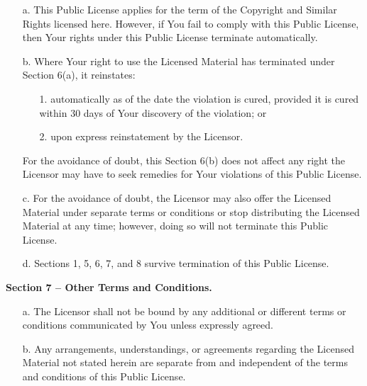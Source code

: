 \begin{enumerate}

	\item[a.] This Public License applies for the term of the Copyright and
	Similar Rights licensed here. However, if You fail to comply with
	this Public License, then Your rights under this Public License
	terminate automatically.

	\item[b.] Where Your right to use the Licensed Material has terminated under
	Section 6(a), it reinstates:

	\begin{enumerate}

		\item[1.] automatically as of the date the violation is cured, provided
			it is cured within 30 days of Your discovery of the
			violation; or

		\item[2.] upon express reinstatement by the Licensor.

	\end{enumerate}

	For the avoidance of doubt, this Section 6(b) does not affect any
	right the Licensor may have to seek remedies for Your violations
	of this Public License.

	\item[c.] For the avoidance of doubt, the Licensor may also offer the
	Licensed Material under separate terms or conditions or stop
	distributing the Licensed Material at any time; however, doing so
	will not terminate this Public License.

	\item[d.] Sections 1, 5, 6, 7, and 8 survive termination of this Public
	License.

\end{enumerate}


\textbf{Section 7 -- Other Terms and Conditions.}

\begin{enumerate}

	\item[a.] The Licensor shall not be bound by any additional or different
	terms or conditions communicated by You unless expressly agreed.

	\item[b.] Any arrangements, understandings, or agreements regarding the
	Licensed Material not stated herein are separate from and
	independent of the terms and conditions of this Public License.

\end{enumerate}


